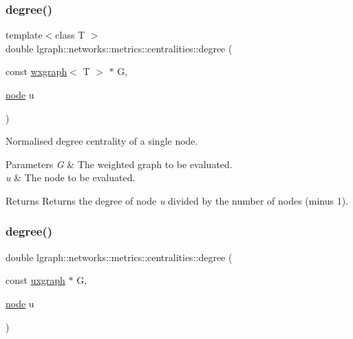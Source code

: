 \subsubsection{\texorpdfstring{degree()}{degree()}\hspace{0.1cm}{\footnotesize\ttfamily [1/4]}}
{\footnotesize\ttfamily template$<$class T $>$ \\
double lgraph\+::networks\+::metrics\+::centralities\+::degree (\begin{DoxyParamCaption}\item[{const \hyperlink{classlgraph_1_1wxgraph}{wxgraph}$<$ T $>$ $\ast$}]{G,  }\item[{\hyperlink{namespacelgraph_a397169dd66adf725210a30fb7251773e}{node}}]{u }\end{DoxyParamCaption})}



Normalised degree centrality of a single node. 


\begin{DoxyParams}{Parameters}
{\em G} & The weighted graph to be evaluated. \\
\hline
{\em u} & The node to be evaluated. \\
\hline
\end{DoxyParams}
\begin{DoxyReturn}{Returns}
Returns the degree of node {\itshape u} divided by the number of nodes (minus 1). 
\end{DoxyReturn}
\mbox{\label{namespacelgraph_1_1networks_1_1metrics_1_1centralities_a059db418660d28d673a154ceef293469}} 
\subsubsection{\texorpdfstring{degree()}{degree()}\hspace{0.1cm}{\footnotesize\ttfamily [2/4]}}
{\footnotesize\ttfamily double lgraph\+::networks\+::metrics\+::centralities\+::degree (\begin{DoxyParamCaption}\item[{const \hyperlink{classlgraph_1_1uxgraph}{uxgraph} $\ast$}]{G,  }\item[{\hyperlink{namespacelgraph_a397169dd66adf725210a30fb7251773e}{node}}]{u }\end{DoxyParamCaption})}



